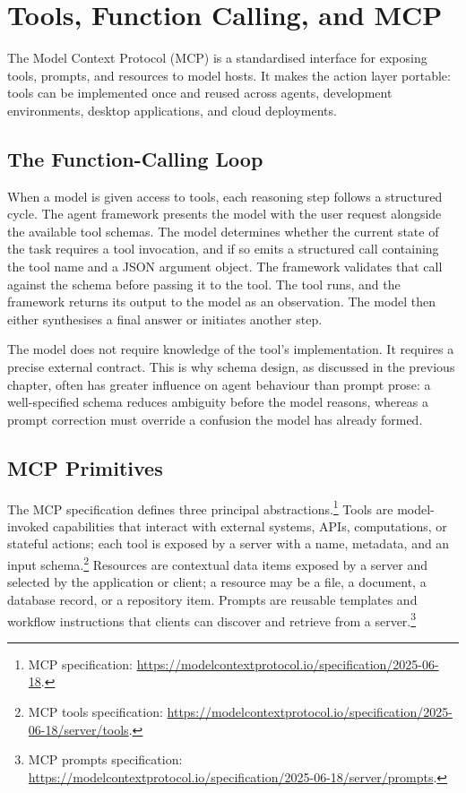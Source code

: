 \chapter{Tools, Function Calling, and MCP}

The Model Context Protocol (MCP) is a standardised interface for exposing tools, prompts,
and resources to model hosts. It makes the action layer portable: tools can be implemented
once and reused across agents, development environments, desktop applications, and cloud
deployments.

\section{The Function-Calling Loop}

When a model is given access to tools, each reasoning step follows a structured cycle. The
agent framework presents the model with the user request alongside the available tool
schemas. The model determines whether the current state of the task requires a tool
invocation, and if so emits a structured call containing the tool name and a JSON argument
object. The framework validates that call against the schema before passing it to the tool.
The tool runs, and the framework returns its output to the model as an observation. The
model then either synthesises a final answer or initiates another step.

The model does not require knowledge of the tool's implementation. It requires a precise
external contract. This is why schema design, as discussed in the previous chapter, often
has greater influence on agent behaviour than prompt prose: a well-specified schema reduces
ambiguity before the model reasons, whereas a prompt correction must override a confusion
the model has already formed.

\section{MCP Primitives}

The MCP specification defines three principal abstractions.\footnote{MCP specification:
\url{https://modelcontextprotocol.io/specification/2025-06-18}.} Tools are model-invoked
capabilities that interact with external systems, APIs, computations, or stateful actions;
each tool is exposed by a server with a name, metadata, and an input
schema.\footnote{MCP tools specification:
\url{https://modelcontextprotocol.io/specification/2025-06-18/server/tools}.} Resources
are contextual data items exposed by a server and selected by the application or client;
a resource may be a file, a document, a database record, or a repository item. Prompts
are reusable templates and workflow instructions that clients can discover and retrieve
from a server.\footnote{MCP prompts specification:
\url{https://modelcontextprotocol.io/specification/2025-06-18/server/prompts}.}

